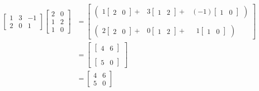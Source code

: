 \documentclass{article}
\begin{document}
\begin{align}
    \begin{bmatrix}
        1 & 3 & -1 \\
        2 & 0 & 1
    \end{bmatrix} \begin{bmatrix}
                    2 & 0 \\
                    1 & 2 \\
                    1 & 0
                  \end{bmatrix} &= \begin{bmatrix}
                        \begin{pmatrix}        
                                        1 \begin{bmatrix} 2 & 0\end{bmatrix} + &3 \begin{bmatrix} 1 & 2 \end{bmatrix} + &(-1) \begin{bmatrix} 1 & 0\end{bmatrix}
                        \end{pmatrix}\\
                                        \\
                        \begin{pmatrix}
                                        2 \begin{bmatrix} 2 & 0\end{bmatrix} + &0 \begin{bmatrix} 1 & 2 \end{bmatrix} +~~~ &1 \begin{bmatrix} 1 & 0\end{bmatrix}
                        \end{pmatrix}
                  \end{bmatrix} \nonumber \\
                                &= \begin{bmatrix}
                                        \begin{bmatrix} 4 & 6 \end{bmatrix}\\
                                        \\
                                        \begin{bmatrix} 5 & 0 \end{bmatrix}
                                  \end{bmatrix} \nonumber \\
                                &= \begin{bmatrix}
                                        4 & 6 \\
                                        5 & 0
                                  \end{bmatrix} \nonumber
\end{align}
\end{document}
